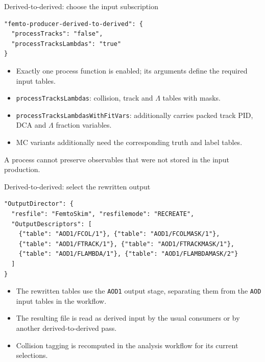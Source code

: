 \begin{frame}[fragile]{Derived-to-derived: choose the input subscription}
 \begin{lstlisting}
"femto-producer-derived-to-derived": {
  "processTracks": "false",
  "processTracksLambdas": "true"
}
 \end{lstlisting}
 \begin{itemize}
 \item Exactly one process function is enabled; its arguments define the required input tables.
 \item \texttt{processTracksLambdas}: collision, track and $\Lambda$ tables with masks.
 \item \texttt{processTracksLambdasWithFitVars}: additionally carries packed track PID, DCA and $\Lambda$ fraction variables.
 \item MC variants additionally need the corresponding truth and label tables.
 \end{itemize}
 \small A process cannot preserve observables that were not stored in the input production.
\end{frame}

\begin{frame}[fragile]{Derived-to-derived: select the rewritten output}
 \begin{lstlisting}
"OutputDirector": {
  "resfile": "FemtoSkim", "resfilemode": "RECREATE",
  "OutputDescriptors": [
    {"table": "AOD1/FCOL/1"}, {"table": "AOD1/FCOLMASK/1"},
    {"table": "AOD1/FTRACK/1"}, {"table": "AOD1/FTRACKMASK/1"},
    {"table": "AOD1/FLAMBDA/1"}, {"table": "AOD1/FLAMBDAMASK/2"}
  ]
}
 \end{lstlisting}
 \begin{itemize}
 \item The rewritten tables use the \texttt{AOD1} output stage, separating them from the \texttt{AOD} input tables in the workflow.
 \item The resulting file is read as derived input by the usual consumers or by another derived-to-derived pass.
 \item Collision tagging is recomputed in the analysis workflow for its current selections.
 \end{itemize}
\end{frame}

